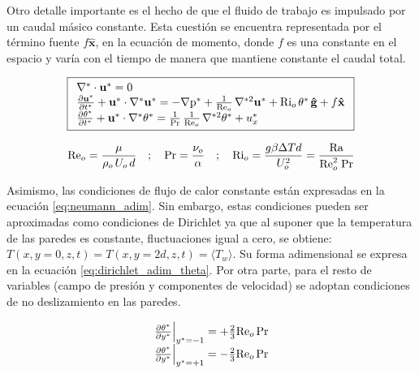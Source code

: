 Otro detalle importante es el hecho de que el fluido de trabajo es impulsado por un caudal másico constante. Esta cuestión se encuentra representada por el término fuente $f \mathbf{\hat{x}}$, en la ecuación de momento, donde $f$ es una constante en el espacio y varía con el tiempo de manera que mantiene constante el caudal total. 

\begin{equation}
\boxed{
\begin{array}{l}
    \nabla^* \cdot \mathbf{u^*} = 0 \\
    \frac{\partial \mathbf{u^*}}{\partial t^*} + \mathbf{u^*} \cdot \nabla^* \mathbf{u^*} = 
    -\nabla \text{p}^* + \frac{1}{\text{Re}_o} \hspace{0.5mm} \nabla^{*2} \mathbf{u^*} + \text{Ri}_o \hspace{0.5mm} \theta^* \hspace{0.5mm} \mathbf{\hat{g}} + f \mathbf{\hat{x}} \\
    \frac{\partial \theta^*}{\partial t^*} + \mathbf{u^*} \cdot \nabla^* \theta^* = 
    \frac{1}{\text{Pr}}\hspace{0.5mm}  \frac{1}{\text{Re}_o} \hspace{0.5mm} \nabla^{*2} \theta^* + u_x^* 
\end{array}
}
\label{eq:gob_system_adim}
\end{equation}

$$\text{Re}_o = \frac{\mu}{\rho_o \hspace{0.5mm} U_o\hspace{0.5mm} d } \quad ; \quad \text{Pr}= \frac{\nu_o}{\alpha} \quad ; \quad \text{Ri}_o = \frac{g \beta \Delta T d}{U_o^2} = \frac{\text{Ra}}{\text{Re}_o^2 \hspace{1mm} \text{Pr}}$$

Asimismo, las condiciones de flujo de calor constante están expresadas en la ecuación \ref{eq:neumann_adim}. Sin embargo, estas condiciones pueden ser aproximadas como condiciones de Dirichlet ya que al suponer que la temperatura de las paredes es constante, fluctuaciones igual a cero, se obtiene: $T(x,y=0,z,t) = T(x,y=2d,z,t) = \langle T_w \rangle$. Su forma adimensional se expresa en la ecuación \ref{eq:dirichlet_adim_theta}. Por otra parte, para el resto de variables (campo de presión y componentes de velocidad) se adoptan condiciones de no deslizamiento en las paredes. 

\begin{align}
\begin{array}{l}
    \left. \frac{\partial \theta^*}{\partial y^*} \right\vert_{y^*=-1} = + \frac{2}{3} \text{Re}_o \hspace{0.5mm} \text{Pr} \\
    \left. \frac{\partial \theta^*}{\partial y^*} \right\vert_{y^*=+1} = - \frac{2}{3} \text{Re}_o \hspace{0.5mm} \text{Pr} 
\end{array}
\label{eq:neumann_adim}
\end{align}

